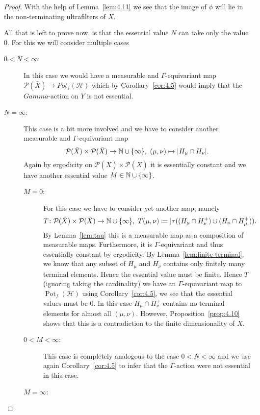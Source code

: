 \begin{proof}
  With the help of Lemma~\ref{lem:4.11} we see that the image of \(\phi\) will lie in the non-terminating ultrafilters of \(X\).

  All that is left to prove now, is that the essential value \(N\) can take only the value \(0\). For this we will consider multiple cases
  \begin{description}
  \item[\(0 < N < \infty\):] In this case we would have a measurable and \(\Gamma\)-equivariant map \(\mathcal{P}(\bar X) \to Pot_f(\mathcal{H})\) which by Corollary~\ref{cor:4.5} would imply that the \(Gamma\)-action on \(Y\) is not essential.
  \item[\(N = \infty\):] This case is a bit more involved and we have to consider another measurable and \(\Gamma\)-equivariant map
    \[
      \mathcal{P}(\bar X) \times \mathcal{P}(\bar X) \to \mathbb{N} \cup \{\infty\},\ (\mu, \nu) \mapsto |H_\mu \cap H_\nu|.
    \]
    Again by ergodicity on \(\mathcal{P}(\bar X) \times \mathcal{P}(\bar X)\) it is essentially constant and we have another essential value \(M \in \mathbb{N} \cup \{\infty\}\).
    \begin{description}
    \item[\(M = 0\):] For this case we have to consider yet another map, namely
      \[
        T\colon \mathcal{P}(\bar X) \times \mathcal{P}(\bar X) \to \mathbb{N} \cup \{\infty\},\ T(\mu, \nu) \coloneqq |\tau((H_\mu \cap H_\nu^+) \cup (H_\nu \cap H_\mu^+)).
      \]
      By Lemma~\ref{lem:tau} this is a measurable map as a composition of measurable maps. Furthermore, it is \(\Gamma\)-equivariant and thus essentially constant by ergodicity. By Lemma~\ref{lem:finite-terminal}, we know that any subset of \(H_\mu\) and \(H_\nu\) contains only finitely many terminal elements. Hence the essential value must be finite. Hence \(T\) (ignoring taking the cardinality) we have an \(\Gamma\)-equivariant map to \(\operatorname{Pot}_f(\mathcal{H})\) using Corollary~\ref{cor:4.5}, we see that the essential values must be 0. In this case \(H_\mu \cap H_\nu^+\) contains no terminal elements for almost all \((\mu, \nu)\). However, Proposition~\ref{prop:4.10} shows that this is a contradiction to the finite dimensionality of \(X\).
    \item[\(0 < M < \infty\):] This case is completely analogous to the case \(0 < N < \infty\) and we use again Corollary~\ref{cor:4.5} to infer that the \(\Gamma\)-action were not essential in this case. 
    \item[\(M = \infty\):] 
    \end{description}
  \end{description}

\end{proof}



